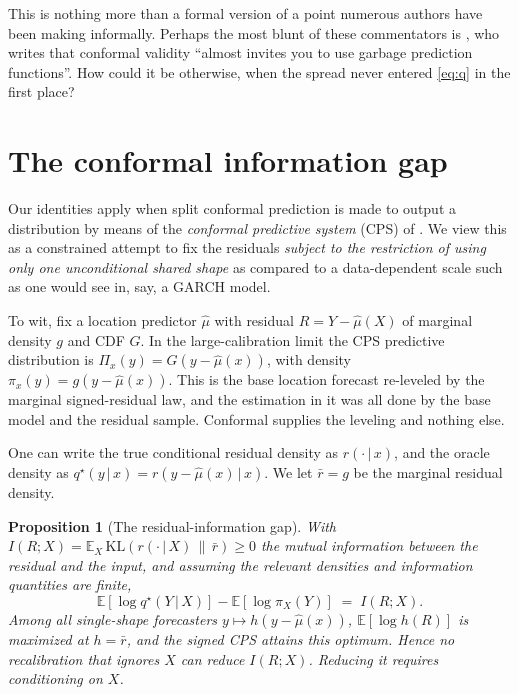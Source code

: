 \documentclass[11pt]{article}
\newtheorem{proposition}{Proposition}
\theoremstyle{definition}
\newcommand{\E}{\mathbb{E}}
\newcommand{\KL}{\mathrm{KL}}
\newcommand{\given}{\,\vert\,}
\begin{document}
This is nothing more than a formal version of a point numerous authors have been making
informally. Perhaps the most blunt of these commentators is \citet{recht2024cover}, who
writes that conformal validity ``almost invites you to use garbage prediction functions''.
How could it be otherwise, when the spread never entered \eqref{eq:q} in the first place?

\section{The conformal information gap}

Our identities apply when split conformal prediction is made to output a distribution by means
of the \emph{conformal predictive system} (CPS) of \citet{vovk2019nonparametric}. We view this
 as a constrained attempt to fix the residuals {\em subject to the
restriction of using only one unconditional shared shape} as compared to a data-dependent
scale such as one would see in, say, a GARCH model. 

To wit, fix a location predictor $\hat\mu$ with residual $R=Y-\hat\mu(X)$ of marginal density $g$
and CDF $G$. In the large-calibration limit the CPS predictive distribution is
$\Pi_x(y)=G(y-\hat\mu(x))$, with density $\pi_x(y)=g(y-\hat\mu(x))$. This is the base
location forecast re-leveled by the marginal signed-residual law, and the estimation in it
was all done by the base model and the residual sample. Conformal supplies the leveling and
nothing else. 

One can write the true conditional residual density as $r(\cdot\given x)$, and the
oracle density as $q^\star(y\given x)=r(y-\hat\mu(x)\given x)$. We let $\bar r=g$ be the
marginal residual density.

\begin{proposition}[The residual-information gap]\label{prop:gap}
With $I(R;X)=\E_X\,\KL(r(\cdot\given X)\,\|\,\bar r)\ge 0$ the mutual information between
the residual and the input, and assuming the relevant densities and information quantities
are finite,
\begin{equation}\label{eq:gap}
  \E[\log q^\star(Y\given X)]-\E[\log \pi_X(Y)] \;=\; I(R;X).
\end{equation}
Among all single-shape forecasters $y\mapsto h(y-\hat\mu(x))$, $\E[\log h(R)]$ is maximized
at $h=\bar r$, and the signed CPS attains this optimum. Hence no recalibration that ignores
$X$ can reduce $I(R;X)$. Reducing it requires conditioning on $X$.
\end{proposition}
\end{document}
